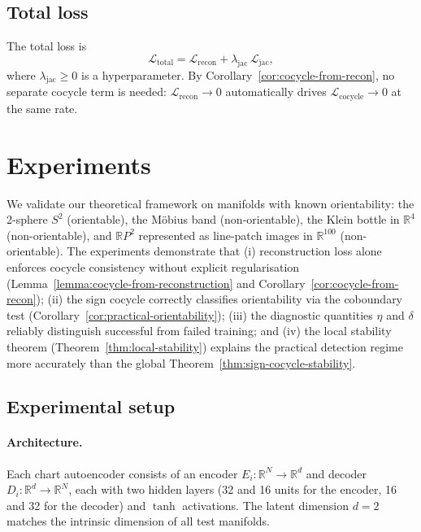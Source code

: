\documentclass[11pt]{article}
\newcommand{\R}{\mathbb{R}}
\theoremstyle{plain}
\theoremstyle{definition}
\theoremstyle{remark}
\begin{document}
\subsection*{Total loss}

The total loss is
\[
\mathcal{L}_{\mathrm{total}} = \mathcal{L}_{\mathrm{recon}} + \lambda_{\mathrm{jac}}\, \mathcal{L}_{\mathrm{jac}},
\]
where $\lambda_{\mathrm{jac}} \geq 0$ is a hyperparameter. By Corollary~\ref{cor:cocycle-from-recon}, no separate cocycle term is needed: $\mathcal{L}_{\mathrm{recon}} \to 0$ automatically drives $\mathcal{L}_{\mathrm{cocycle}} \to 0$ at the same rate.


 

\section{Experiments}\label{sec:experiments}

We validate our theoretical framework on manifolds with known orientability: the 2-sphere $S^2$ (orientable), the M\"obius band (non-orientable), the Klein bottle in $\R^4$ (non-orientable), and $\mathbb{R}P^2$ represented as line-patch images in $\R^{100}$ (non-orientable). The experiments demonstrate that (i) reconstruction loss alone enforces cocycle consistency without explicit regularisation (Lemma~\ref{lemma:cocycle-from-reconstruction} and Corollary~\ref{cor:cocycle-from-recon}); (ii) the sign cocycle correctly classifies orientability via the coboundary test (Corollary~\ref{cor:practical-orientability}); (iii) the diagnostic quantities $\eta$ and $\delta$ reliably distinguish successful from failed training; and (iv) the local stability theorem (Theorem~\ref{thm:local-stability}) explains the practical detection regime more accurately than the global Theorem~\ref{thm:sign-cocycle-stability}.

\subsection{Experimental setup}\label{sec:exp-setup}

\paragraph{Architecture.}
Each chart autoencoder consists of an encoder $E_i \colon \R^N \to \R^d$ and decoder $D_i \colon \R^d \to \R^N$, each with two hidden layers (32 and 16 units for the encoder, 16 and 32 for the decoder) and $\tanh$ activations. The latent dimension $d = 2$ matches the intrinsic dimension of all test manifolds.
\end{document}
